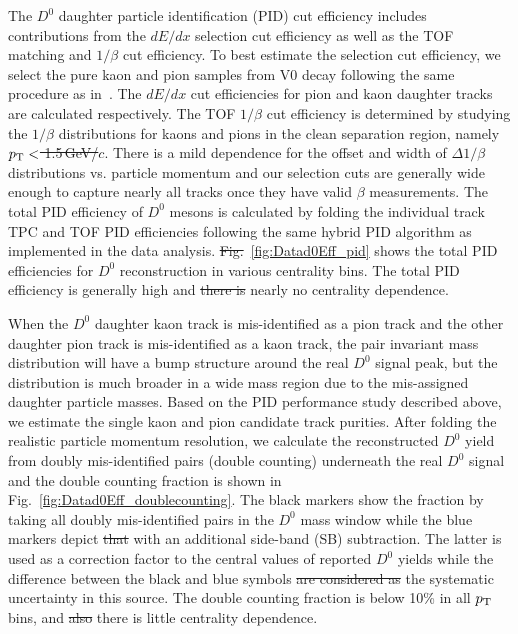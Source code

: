 \documentclass[%
 reprint,	
 amsmath,amssymb,
 aps,
 prc,
]{revtex4-1}
\providecommand{\DIFaddtex}[1]{{\protect\color{blue}\uwave{#1}}} %
\providecommand{\DIFdeltex}[1]{{\protect\color{red}\sout{#1}}}                      %
\providecommand{\DIFaddbegin}{} %
\providecommand{\DIFaddend}{} %
\providecommand{\DIFdelbegin}{} %
\providecommand{\DIFdelend}{} %
\providecommand{\DIFadd}[1]{\texorpdfstring{\DIFaddtex{#1}}{#1}} %
\providecommand{\DIFdel}[1]{\texorpdfstring{\DIFdeltex{#1}}{}} %
\begin{document}
The $D^0$ daughter particle identification (PID) cut efficiency includes contributions from the $dE/dx$ selection cut efficiency as well as the TOF matching and $1/\beta$ cut efficiency. To best estimate the selection cut efficiency, we select the pure kaon and pion samples from V0 \DIFaddbegin \DIFadd{($\phi,K_{S}^{0}$) }\DIFaddend decay following the same procedure as in~\cite{Shao:2005iu,Xu:2008th}. The $dE/dx$ cut efficiencies for pion and kaon daughter tracks are calculated respectively. The TOF $1/\beta$ cut efficiency is determined by studying the $1/\beta$ distributions for kaons and pions in the clean separation region, namely \DIFdelbegin \DIFdel{$p_{\rm T}<$ 1.5\,GeV/$c$}\DIFdelend \DIFaddbegin \DIFadd{$p_{T}< 1.5\,\rm{GeV}/c$}\DIFaddend . There is a mild dependence for the offset and width of $\Delta 1/\beta$ distributions vs. particle momentum and our selection cuts are generally wide enough to capture nearly all tracks once they have valid $\beta$ measurements. The total PID efficiency of $D^0$ mesons is calculated by folding the individual track TPC and TOF PID efficiencies following the same hybrid PID algorithm as implemented in the data analysis. \DIFdelbegin \DIFdel{Fig.}\DIFdelend \DIFaddbegin \DIFadd{Figure}\DIFaddend ~\ref{fig:Datad0Eff_pid} shows the total PID efficiencies for $D^0$ reconstruction in various centrality bins. The total PID efficiency is generally high and \DIFdelbegin \DIFdel{there is }\DIFdelend nearly no centrality \DIFaddbegin \DIFadd{or $p_T$ }\DIFaddend dependence.

When the $D^0$ daughter kaon track is mis-identified as a pion track and the other daughter pion track is mis-identified as a kaon track, the pair invariant mass distribution will have a bump structure around the real $D^0$ signal peak, but the distribution is much broader in a wide mass region due to the mis-assigned daughter particle masses. Based on the PID  performance study described above, we estimate the single kaon and pion candidate track purities. After folding the realistic particle momentum resolution, we calculate the reconstructed $D^0$ yield from doubly mis-identified pairs (double counting) underneath the real $D^0$ signal and the double counting fraction is shown in Fig.~\ref{fig:Datad0Eff_doublecounting}. The black markers show the fraction by taking all doubly mis-identified pairs in the $D^0$ mass window while the blue markers depict \DIFdelbegin \DIFdel{that }\DIFdelend \DIFaddbegin \DIFadd{it }\DIFaddend with an additional side-band (SB) subtraction. The latter is used as a correction factor to the central values of reported $D^0$ yields while the difference between the black and blue symbols \DIFdelbegin \DIFdel{are considered as }\DIFdelend \DIFaddbegin \DIFadd{is considered }\DIFaddend the systematic uncertainty in this source. The double counting fraction is below 10\% in all \DIFdelbegin \DIFdel{$p_{\rm T}$ }\DIFdelend \DIFaddbegin \DIFadd{$p_{T}$ }\DIFaddend bins, and \DIFdelbegin \DIFdel{also }\DIFdelend there is little centrality dependence.
\end{document}
